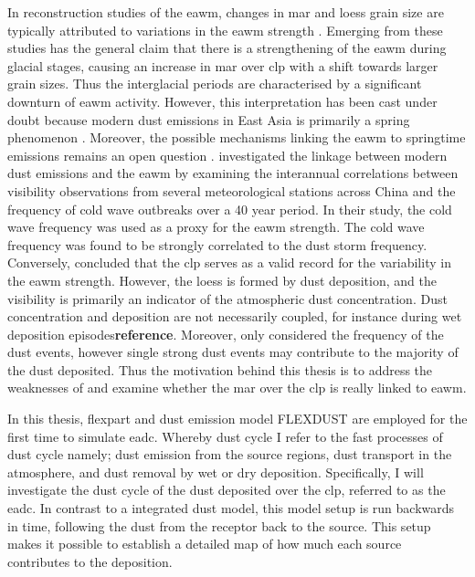 In reconstruction studies of the \acrfull{eawm}, changes in \acrfull{mar} and loess grain size are typically attributed to variations in the \acrshort{eawm} strength \parencite{stevens2007reinterpreting}.
Emerging from these studies has the general claim that there is a strengthening of the \acrshort{eawm} during glacial stages, causing an increase in \acrshort{mar} over \acrshort{clp} with a shift towards larger grain sizes. Thus  the interglacial  periods  are characterised by a  significant downturn of \acrshort{eawm} activity.
However, this interpretation has been cast under doubt because modern dust emissions in East Asia is primarily a spring phenomenon \parencite{sun2001spatial}.
Moreover, the possible mechanisms linking the \acrshort{eawm} to springtime emissions remains an open question \parencite{roe2009interpretation}. 
\textcite{wyrwoll2016cold} investigated the linkage between modern dust emissions and the \acrshort{eawm} by examining the interannual correlations between visibility observations from several meteorological stations across China and the frequency of cold wave outbreaks over a 40 year period. 
In their study, the cold wave frequency was used as a proxy for the \acrshort{eawm} strength. 
The cold wave frequency was found to be strongly correlated to the dust storm frequency.
Conversely, \textcite{wyrwoll2016cold} concluded that the \acrshort{clp} serves as a valid record for the variability in the \acrshort{eawm} strength.
However, the loess is formed by dust deposition, and the visibility is primarily an indicator of the atmospheric dust concentration. 
Dust concentration and deposition are not necessarily coupled, for instance during wet deposition episodes\textbf{reference}. 
Moreover, \textcite{wyrwoll2016cold} only considered the frequency of the dust events, however single strong dust events may contribute to the majority of the dust deposited. 
Thus the motivation behind this thesis is to address the weaknesses of \textcite{wyrwoll2016cold} and examine whether the \acrshort{mar} over the \acrshort{clp} is really linked to \acrshort{eawm}.

In this thesis, \acrfull{flexpart} \parencite{Flexpart10.4_ref} and dust emission model FLEXDUST \parencite{flexdust_ref_2016} are employed for the first time to simulate \acrfull{eadc}. Whereby dust cycle I refer to the fast processes of dust cycle namely; dust emission from the source regions, dust transport in the atmosphere, and dust removal by wet or dry deposition. Specifically, I will investigate the dust cycle of the dust deposited over the \acrshort{clp}, referred to as the \acrshort{eadc}.
In contrast to a integrated dust model, this model setup is run backwards in time, following the dust from the receptor back to the source. This setup makes it possible to establish a detailed map of how much each source contributes to the deposition. 


